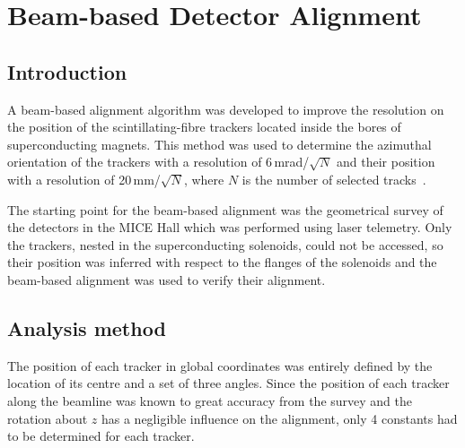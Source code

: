 \graphicspath{{09-Detector-alignment/Figures/}}

\section{Beam-based Detector Alignment}
\label{Sect:DA}

\subsection{Introduction}
\label{SubSect:DA_Intro}

A beam-based alignment algorithm was developed to improve the resolution on the position of the scintillating-fibre trackers located inside the bores of superconducting magnets. This method was used to determine the azimuthal orientation of the trackers with a resolution of 6\,mrad/$\sqrt{N}$ and their position with a resolution of 20\,mm/$\sqrt{N}$, where $N$ is the number of selected tracks~\cite{2018arXiv1805.06623T}.


The starting point for the beam-based alignment was the geometrical survey of the detectors in the MICE Hall which was performed using laser telemetry.
Only the trackers, nested in the superconducting solenoids, could not be accessed, so their position was inferred with respect to the flanges of the solenoids and the beam-based alignment was used to verify their alignment.

\subsection{Analysis method}
\label{SubSect:DA_Analysis}

The position of each tracker in global coordinates was entirely defined by the location of its centre and a set of three angles.
Since the position of each tracker along the beamline was known to great accuracy from the survey and the rotation about $z$ has a negligible influence on the alignment, only 4 constants had to be determined for each tracker.


